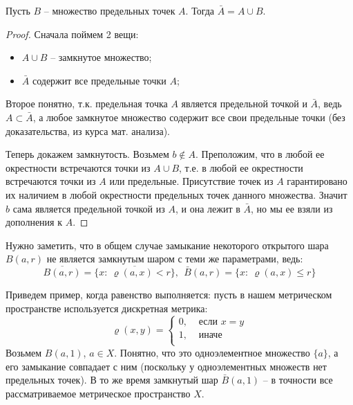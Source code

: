 \documentclass[../main.tex]{subfiles}
\begin{document}
	\begin{statement}
		Пусть $B$  --  множество предельных точек $A$. Тогда $\bar{A}=A\cup B$.
	\end{statement}
	\begin{proof}
		Сначала поймем 2 вещи:
		\begin{itemize}[label={--}]
			\item $A\cup B$ -- замкнутое множество;
			\item $\bar{A}$ содержит все предельные точки $A$;
		\end{itemize}
		
		Второе понятно, т.к. предельная точка $A$ является предельной точкой и $\bar{A}$, ведь $A\subset \bar{A}$, а любое замкнутое множество содержит все свои предельные точки (без доказательства, из курса мат. анализа).
		
		Теперь докажем замкнутость. Возьмем $b\notin A$. Преположим, что в любой ее окрестности встречаются точки из $A\cup B$, т.е. в любой ее окрестности встречаются точки из $A$ или предельные. Присутствие точек из $A$ гарантировано их наличием в любой окрестности предельных точек данного множества. Значит $b$ сама является предельной точкой из $A$, и она лежит в $\bar{A}$, но мы ее взяли из дополнения к $A$.
		
	\end{proof}
	\begin{remark}
		Нужно заметить, что в общем случае замыкание некоторого открытого шара $B(a, r)$ не является замкнутым шаром с теми же параметрами, ведь:
		\[
		\overline{B(a, r)}=
		\overline{\{x: \ \varrho(a, x)<r\}}, \ \
		\bar{B}(a, r)=\{x: \ \varrho(a, x)\leqslant r\}
		\]
		
		Приведем пример, когда равенство выполняется: пусть в нашем метрическом пространстве используется дискретная метрика:
		\[
		\varrho(x, y)=
		\begin{cases}
		0, & \text{ если } x=y\\
		1, & \text{ иначе }\\
		\end{cases}
		\]
		Возьмем $B(a, 1)$, $a\in X$. Понятно, что это одноэлементное множество $\{a\}$, а его замыкание совпадает с ним (поскольку у одноэлементных множеств нет предельных точек). В то же время замкнутый шар $\bar{B}(a, 1)$ -- в точности все рассматриваемое метрическое пространство $X$.
	\end{remark}
\end{document}
